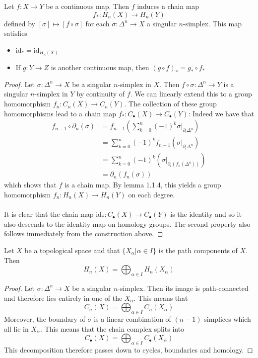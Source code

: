 \documentclass[a4paper]{article}
\begin{document}
\begin{prp}{}{} Let $f:X\to Y$ be a continuous map. Then $f$ induces a chain map $$f_\ast:H_n(X)\to H_n(Y)$$ defined by $[\sigma]\mapsto[f\circ\sigma]$ for each $\sigma:\Delta^n\to X$ a singular $n$-simplex. This map satisfies 
\begin{itemize}
\item $\text{id}_\ast=\text{id}_{H_n(X)}$
\item If $g:Y\to Z$ is another continuous map, then $(g\circ f)_\ast=g_\ast\circ f_\ast$
\end{itemize} \tcbline
\begin{proof}
Let $\sigma:\Delta^n\to X$ be a singular $n$-simplex in $X$. Then $f\circ\sigma:\Delta^n\to Y$ is a singular $n$-simplex in $Y$ by continuity of $f$. We can linearly extend this to a group homomorphism $f_n:C_n(X)\to C_n(Y)$. The collection of these group homomorphisms lead to a chain map $f_\ast:C_\bullet(X)\to C_\bullet(Y)$: Indeed we have that 
\begin{align*}
f_{n-1}\circ\partial_n(\sigma)&=f_{n-1}\left(\sum_{k=0}^n(-1)^k\sigma|_{\partial_i\Delta^n}\right)\\
&=\sum_{k=0}^n(-1)^kf_{n-1}\left(\sigma|_{\partial_i\Delta^n}\right)\\
&=\sum_{k=0}^n(-1)^k\left(\sigma|_{\partial_i(f_n(\Delta^n))}\right)\\
&=\partial_n(f_n(\sigma))
\end{align*}
which shows that $f$ is a chain map. By lemma 1.1.4, this yields a group homomorphism $f_n:H_n(X)\to H_n(Y)$ on each degree. \\~\\

It is clear that the chain map $\text{id}_\ast:C_\bullet(X)\to C_\bullet(Y)$ is the identity and so it also descends to the identity map on homology groups. The second property also follows immediately from the construction above. 
\end{proof}
\end{prp}

\begin{prp}{}{} Let $X$ be a topological space and that $\{X_\alpha|\alpha\in I\}$ is the path components of $X$. Then $$H_n(X)=\bigoplus_{\alpha\in I} H_n(X_\alpha)$$ \tcbline
\begin{proof}
Let $\sigma:\Delta^n\to X$ be a singular $n$-simplex. Then its image is path-connected and therefore lies entirely in one of the $X_\alpha$. This means that $$C_n(X)=\bigoplus_{\alpha\in I}C_n(X_\alpha)$$ Moreover, the boundary of $\sigma$ is a linear combination of $(n-1)$ simplices which all lie in $X_\alpha$. This means that the chain complex splits into $$C_\bullet(X)=\bigoplus_{\alpha\in I}C_\bullet(X_\alpha)$$ This decomposition therefore passes down to cycles, boundaries and homology. 
\end{proof}
\end{prp}
\end{document}
